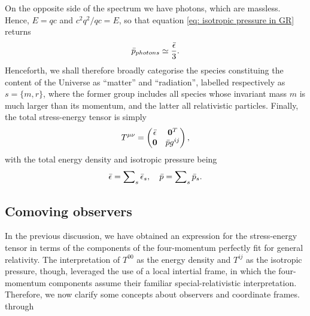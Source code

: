 On the opposite side of the spectrum we have photons, which are massless. Hence, $E = qc$ and $c^2q^2/qc = E$, so that equation \eqref{eq: isotropic pressure in GR} returns
\begin{eqnarray}
    \bar{p}_{photons} \simeq \frac{\bar{\epsilon}}{3}.
\end{eqnarray}
Henceforth, we shall therefore broadly categorise the species constituing the content of the Universe as ``matter'' and ``radiation'', labelled respectively as $s = \{m,r\}$, where the former group includes all species whose invariant mass $m$ is much larger than its momentum, and the latter all relativistic particles. Finally, the total stress-energy tensor is simply 
\begin{equation}
\label{eq: total stress-energy tensor}
    T^{\mu\nu} = 
    \begin{pmatrix}
        \bar{\epsilon} & \bm{0}^T \\
        \bm{0} & \bar{p}g^{ij}    
    \end{pmatrix},
\end{equation}
with the total energy density and isotropic pressure being 
\begin{equation}
    \bar{\epsilon} = \sum\nolimits_s \bar{\epsilon}_s,\quad \bar{p} = \sum\nolimits_s \bar{p}_s.
\end{equation}

\subsection{Comoving observers}
In the previous discussion, we have obtained an expression for the stress-energy tensor in terms of the components of the four-momentum perfectly fit for general relativity. The interpretation of $T^{00}$ as the energy density and $T^{ij}$ as the isotropic pressure, though, leveraged the use of a local intertial frame, in which the four-momentum components assume their familiar special-relativistic interpretation. Therefore, we now clarify some concepts about observers and coordinate frames. through 

